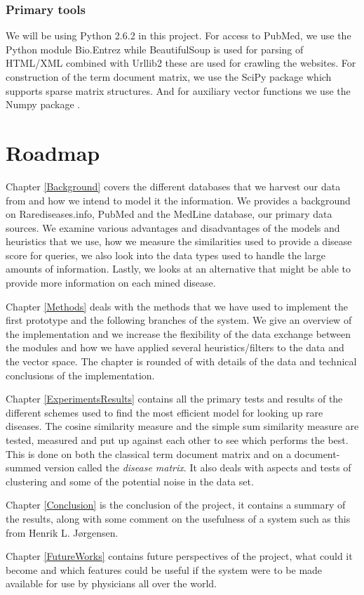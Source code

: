 
\subsubsection{Primary tools}
We will be using Python 2.6.2 \cite{PythonLanguage} in this project. For access to PubMed, we use
the Python module Bio.Entrez \cite{EntrezProgUtil} while BeautifulSoup
\cite{BS} is used for parsing of HTML/XML combined with Urllib2
\cite{UL2} these are used for crawling the websites. For construction
of the term document matrix, we use the SciPy package \cite{SciPy}
which supports sparse matrix structures. And for auxiliary vector
functions we use the Numpy package \cite{NumPy}.

\section{Roadmap}

Chapter \ref{Background} covers the different databases that we
harvest our data from and how we intend to model it the
information. We provides a background on Rarediseases.info, PubMed and
the MedLine database, our primary data sources. We examine various
advantages and disadvantages of the models and heuristics that we use,
how we measure the similarities used to provide a disease score for
queries, we also look into the data types used to handle the large
amounts of information. Lastly, we looks at an alternative that might
be able to provide more information on each mined disease.

Chapter \ref{Methods} deals with the methods that we have used to
implement the first prototype and the following branches of the
system. We give an overview of the implementation and we increase the
flexibility of the data exchange between the modules and how we have
applied several heuristics/filters to the data and the vector
space. The chapter is  rounded of
with details of the data and technical conclusions of the
implementation.

Chapter \ref{ExperimentsResults} contains all the primary tests and
results of the different schemes used to find the most efficient model
for looking up rare diseases. The cosine similarity measure and the
simple sum similarity measure are tested, measured and put up against
each other to see which performs the best. This is done on both the
classical term document matrix and on a document-summed version called
the \textit{disease matrix}. It also deals with aspects and tests of
clustering and some of the potential noise in the data set.

Chapter \ref{Conclusion} is the conclusion of the project, it contains
a summary of the results, along with some comment on the usefulness of
a system such as this from Henrik L. J\o rgensen.


Chapter \ref{FutureWorks} contains future perspectives of the project,
what could it become and which features could be useful if the system
were to be made available for use by physicians all over the world.

